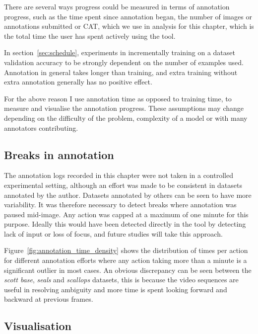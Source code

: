 There are several ways progress could be measured in terms of annotation progress, such as the time spent since annotation began, the number of images or annotations submitted or \gls{CAT}, which we use in analysis for this chapter, which is the total time the user has spent actively using the tool.
 
In section~\ref{sec:schedule}, experiments in incrementally training on a dataset validation accuracy to be strongly dependent on the number of examples used. Annotation in general takes longer than training, and extra training without extra annotation generally has no positive effect.

For the above reason I use annotation time as opposed to training time, to measure and visualise the annotation progress. These assumptions  may change depending on the difficulty of the problem, complexity of a model or with many annotators contributing.



\subsection {Breaks in annotation}
\label{sec:break_detection}

The annotation logs recorded in this chapter were not taken in a controlled experimental setting, although an effort was made to be consistent in datasets annotated by the author. Datasets annotated by others can be seen to have more variability. It was therefore necessary to detect breaks where annotation was paused mid-image. Any action was capped at a maximum of one minute for this purpose. Ideally this would have been detected directly in the tool by detecting lack of input or loss of focus, and future studies will take this approach. 

Figure~\ref{fig:annotation_time_density} shows the distribution of times per action for different annotation efforts where any action taking more than a minute is a significant outlier in most cases. An obvious discrepancy can be seen between the \emph{scott base}, \emph{seals} and \emph{scallops} datasets, this is because the video sequences are useful in resolving ambiguity and more time is spent looking forward and backward at previous frames.

\subsection{Visualisation}
\label{sec:visualisation}

